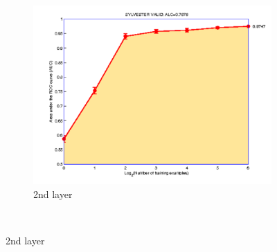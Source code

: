 \begin{figure}
\begin{subfigure}{.3\textwidth}
\includegraphics[height=0.15\textheight,keepaspectratio]{article1/images/syl1.pdf}
\caption{2nd layer}
\end{subfigure}\\


\end{figure}
